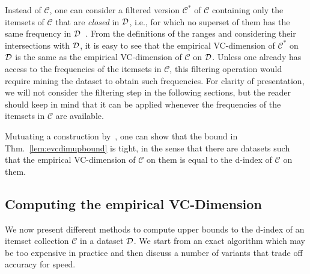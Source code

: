 Instead of $\mathcal{C}$, one can consider a filtered version
$\mathcal{C}^*$ of $\mathcal{C}$ containing only the itemsets of $\mathcal{C}$
that are \emph{closed} in ${\cal D}$, i.e., for which no superset of them has the same
frequency in ${\cal D}$~\citep{CaldersRB06}. From the definitions of the ranges and
considering their intersections with ${\cal D}$, it is easy to see that the empirical
VC-dimension of $\mathcal{C}^*$ on ${\cal D}$ is the same as the empirical
VC-dimension of $\mathcal{C}$ on ${\cal D}$. Unless one already has access to the
frequencies of the itemsets in $\mathcal{C}$, this filtering operation would
require mining the dataset to obtain such frequencies. For clarity of
presentation, we will not consider the filtering step in the following
sections, but the reader should keep in mind that it can be applied whenever the
frequencies of the itemsets in $\mathcal{C}$ are available.

Mutuating a construction by~\citet{RiondatoU14}, one can show that the bound in
Thm.~\ref{lem:evcdimupbound} is tight, in the sense that there are datasets
such that the empirical VC-dimension of $\mathcal{C}$ on them is equal to the
d-index of $\mathcal{C}$ on them.

\subsection{Computing the empirical VC-Dimension}\label{sec:computvc}
We now present different methods to compute upper bounds to the d-index of an
itemset collection $\mathcal{C}$ in a dataset ${\cal D}$. We start from an exact
algorithm which may be too expensive in practice and then discuss a number of
variants that trade off accuracy for speed.

